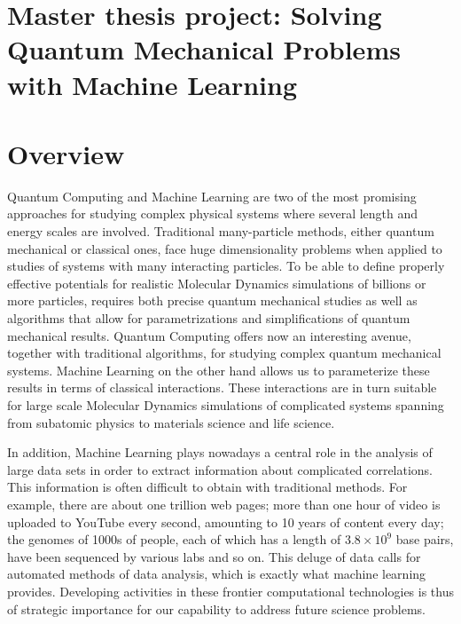 \documentclass[10pt]{article}
\begin{document}
\section*{Master thesis project:  Solving Quantum Mechanical Problems with Machine Learning}

\section*{Overview}

Quantum Computing and Machine Learning are two of the most promising
approaches for studying complex physical systems where several length
and energy scales are involved.  Traditional many-particle methods,
either quantum mechanical or classical ones, face huge dimensionality
problems when applied to studies of systems with many interacting
particles. To be able to define properly effective potentials for
realistic Molecular Dynamics simulations of billions or more particles,
requires both precise quantum mechanical studies as well as algorithms
that allow for parametrizations and simplifications of quantum
mechanical results. Quantum Computing offers now an interesting
avenue, together with traditional algorithms, for studying complex
quantum mechanical systems. Machine Learning on the other hand allows us to parameterize
these results in terms of classical interactions. These interactions
are in turn suitable for large scale Molecular Dynamics simulations of
complicated systems spanning from subatomic physics to materials
science and life science.

In addition, Machine Learning plays nowadays a central role
in the analysis of large data sets in order to extract information
about complicated correlations. This information is often difficult to
obtain with traditional methods. For example, there are about one
trillion web pages; more than one hour of video is uploaded to YouTube
every second, amounting to 10 years of content every day; the genomes
of 1000s of people, each of which has a length of $3.8\times 10^9$
base pairs, have been sequenced by various labs and so on. This deluge
of data calls for automated methods of data analysis, which is exactly
what machine learning provides.  Developing activities in these
frontier computational technologies is thus of strategic importance
for our capability to address future science problems.
\end{document}
